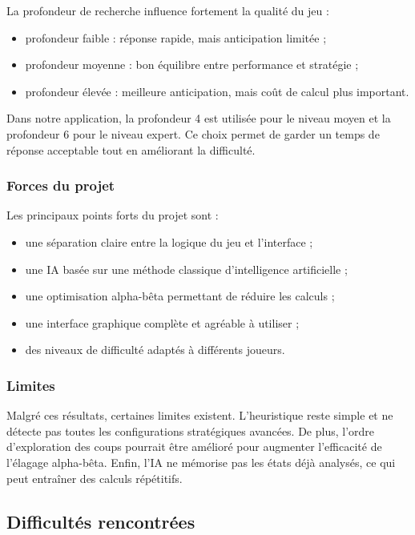 \documentclass[12pt,a4paper]{article}
\begin{document}
La profondeur de recherche influence fortement la qualité du jeu :

\begin{itemize}[leftmargin=1.2cm]
    \item profondeur faible : réponse rapide, mais anticipation limitée ;
    \item profondeur moyenne : bon équilibre entre performance et stratégie ;
    \item profondeur élevée : meilleure anticipation, mais coût de calcul plus important.
\end{itemize}

Dans notre application, la profondeur 4 est utilisée pour le niveau moyen et la profondeur 6 pour le niveau expert. Ce choix permet de garder un temps de réponse acceptable tout en améliorant la difficulté.

\subsubsection{Forces du projet}

Les principaux points forts du projet sont :

\begin{itemize}[leftmargin=1.2cm]
    \item une séparation claire entre la logique du jeu et l'interface ;
    \item une IA basée sur une méthode classique d'intelligence artificielle ;
    \item une optimisation alpha-bêta permettant de réduire les calculs ;
    \item une interface graphique complète et agréable à utiliser ;
    \item des niveaux de difficulté adaptés à différents joueurs.
\end{itemize}

\subsubsection{Limites}

Malgré ces résultats, certaines limites existent. L'heuristique reste simple et ne détecte pas toutes les configurations stratégiques avancées. De plus, l'ordre d'exploration des coups pourrait être amélioré pour augmenter l'efficacité de l'élagage alpha-bêta. Enfin, l'IA ne mémorise pas les états déjà analysés, ce qui peut entraîner des calculs répétitifs.


\subsection{Difficultés rencontrées}
\end{document}
